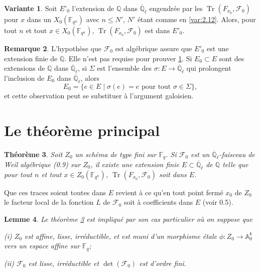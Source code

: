 \documentclass[11pt,a4paper]{article}
\theoremstyle{plain}
\newtheorem{theorem}{Th\'eor\`eme}
\newtheorem{lemma}[theorem]{Lemme}
\theoremstyle{definition}
\newtheorem{remark}[theorem]{Remarque}
\newtheorem{variante}[theorem]{Variante}
\DeclareMathOperator{\tr}{Tr}
\begin{document}
\begin{variante}\label{var:2.13}
Soit $E'_0$ l'extension de $\mathbb{Q}$ dans $\overline{\mathbb{Q}}_\ell$ engendr\'ee par les $\tr(F_{x_0}, \mathcal{F}_0)$ pour $x$ dans un $X_0(\mathbb{F}_{q^n})$ avec $n \leq N'$, $N'$ \'etant comme en \ref{var:2.12}. Alors, pour tout $n$ et tout $x \in X_0(\mathbb{F}_{q^n})$, $\tr(F_{x_0}, \mathcal{F}_0)$ est dans $E'_0$.
\end{variante}

\begin{remark}\label{rem:2.14}
L'hypoth\`ese que $\mathcal{F}_0$ est alg\'ebrique assure que $E'_0$ est une extension finie de $\mathbb{Q}$. Elle n'est pas requise pour prouver \ref{var:2.13}. Si $E_0 \subset E$ sont des extensions de $\mathbb{Q}$ dans $\overline{\mathbb{Q}}_\ell$, si $\Sigma$ est l'ensemble des $\sigma: E \to \overline{\mathbb{Q}}_\ell$ qui prolongent l'inclusion de $E_0$ dans $\overline{\mathbb{Q}}_\ell$, alors
\[
E_0 = \{e \in E \mid \sigma(e) = e \text{ pour tout } \sigma \in \Sigma\},
\]
et cette observation peut se substituer \`a l'argument galoisien.
\end{remark}

\section{Le th\'eor\`eme principal}

\begin{theorem}\label{thm:3.1}
Soit $Z_0$ un sch\'ema de type fini sur $\mathbb{F}_q$. Si $\mathcal{F}_0$ est un $\overline{\mathbb{Q}}_\ell$-faisceau de Weil alg\'ebrique (0.9) sur $Z_0$, il existe une extension finie $E \subset \overline{\mathbb{Q}}_\ell$ de $\mathbb{Q}$ telle que pour tout $n$ et tout $x \in Z_0(\mathbb{F}_{q^n})$, $\tr(F_{x_0}, \mathcal{F}_0)$ soit dans $E$.
\end{theorem}

Que ces traces soient toutes dans $E$ revient \`a ce qu'en tout point ferm\'e $x_0$ de $Z_0$ le facteur local de la fonction $L$ de $\mathcal{F}_0$ soit \`a coefficients dans $E$ (voir 0.5).

\begin{lemma}\label{lem:3.2}
Le th\'eor\`eme \ref{thm:3.1} est impliqu\'e par son cas particulier o\`u on suppose que

\emph{(i)} $Z_0$ est affine, lisse, irr\'eductible, et est muni d'un morphisme \'etale $\phi: Z_0 \to \mathbb{A}_0^{k}$ vers un espace affine sur $\mathbb{F}_q$;

\emph{(ii)} $\mathcal{F}_0$ est lisse, irr\'eductible et $\det(\mathcal{F}_0)$ est d'ordre fini.
\end{lemma}
\end{document}
